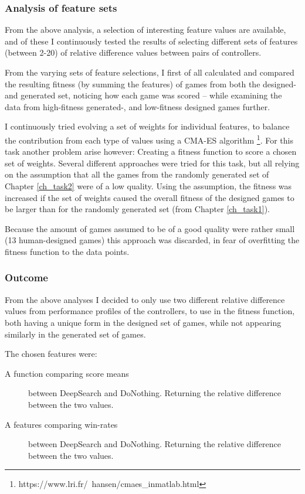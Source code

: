 \documentclass[a4paper,titlepage,final]{report}
\begin{document}
\subsubsection*{Analysis of feature sets}
From the above analysis, a selection of interesting feature values are available, and of these I continuously tested the results of  selecting different sets of features (between 2-20) of relative difference values between pairs of controllers.

From the varying sets of feature selections, I first of all calculated and compared the resulting fitness (by summing the features) of games from both the designed- and generated set, noticing how each game was scored -- while examining the data from high-fitness generated-, and low-fitness designed games further.

I continuously tried evolving a set of weights for individual features, to balance the contribution from each type of values using a CMA-ES algorithm \footnote{https://www.lri.fr/~hansen/cmaes\_inmatlab.html}.
For this task another problem arise however: Creating a fitness function to score a chosen set of weights.
Several different approaches were tried for this task, but all relying on the assumption that all the games from the randomly generated set of Chapter \ref{ch_task2} were of a low quality.
Using the assumption, the fitness was increased if the set of weights caused the overall fitness of the designed games to be larger than for the randomly generated set (from Chapter \ref{ch_task1}).

Because the amount of games assumed to be of a good quality were rather small (13 human-designed games) this approach was discarded, in fear of overfitting the fitness function to the data points.


\subsubsection*{Outcome}
From the above analyses I decided to only use two different relative difference values from performance profiles of the controllers, to use in the fitness function, both having a unique form in the designed set of games, while not appearing similarly in the generated set of games.

The chosen features were:
\begin{description}
\item[A function comparing score means] between DeepSearch and DoNothing. Returning the relative difference between the two values.
\item[A features comparing win-rates] between DeepSearch and DoNothing. Returning the relative difference between the two values.
\end{description}
\end{document}
